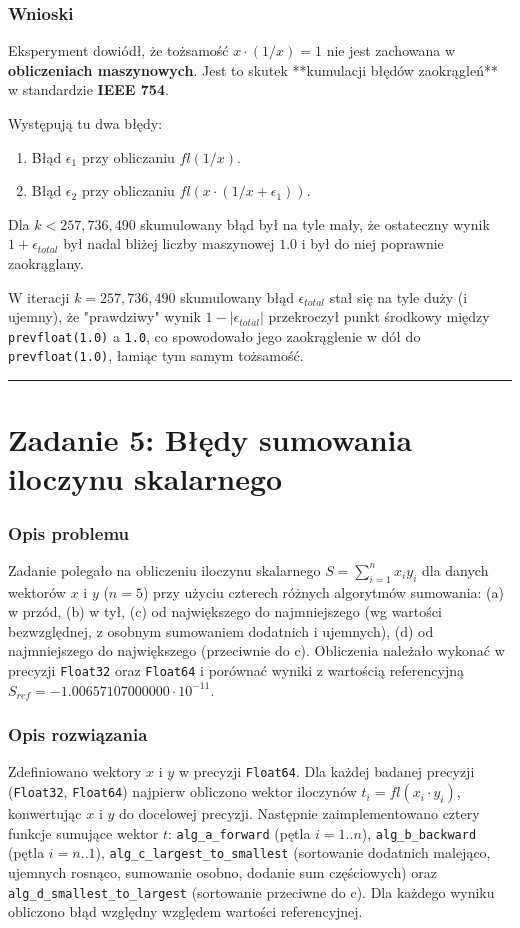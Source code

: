 \documentclass[11pt, a4paper]{article}
\newcommand{\taskseparator}{\leavevmode\leaders\hrule height 0.5pt\hfill\kern0pt}
\begin{document}
\subsubsection{Wnioski}
Eksperyment dowiódł, że tożsamość $x \cdot (1/x) = 1$ nie jest zachowana w \textbf{obliczeniach maszynowych}. Jest to skutek **kumulacji błędów zaokrągleń** w standardzie \textbf{IEEE 754}.

Występują tu dwa błędy:
\begin{enumerate}
    \item Błąd $\epsilon_1$ przy obliczaniu $fl(1/x)$.
    \item Błąd $\epsilon_2$ przy obliczaniu $fl(x \cdot (1/x + \epsilon_1))$.
\end{enumerate}
Dla $k < 257,736,490$ skumulowany błąd był na tyle mały, że ostateczny wynik $1 + \epsilon_{total}$ był nadal bliżej liczby maszynowej $1.0$ i był do niej poprawnie zaokrąglany.

W iteracji $k = 257,736,490$ skumulowany błąd $\epsilon_{total}$ stał się na tyle duży (i ujemny), że "prawdziwy" wynik $1 - |\epsilon_{total}|$ przekroczył punkt środkowy między \texttt{prevfloat(1.0)} a \texttt{1.0}, co spowodowało jego zaokrąglenie w dół do \texttt{prevfloat(1.0)}, łamiąc tym samym tożsamość.

\taskseparator

\section{Zadanie 5: Błędy sumowania iloczynu skalarnego}

\subsubsection{Opis problemu}
Zadanie polegało na obliczeniu iloczynu skalarnego $S = \sum_{i=1}^{n} x_i y_i$ dla danych wektorów $x$ i $y$ ($n=5$) przy użyciu czterech różnych algorytmów sumowania: (a) w przód, (b) w tył, (c) od największego do najmniejszego (wg wartości bezwzględnej, z osobnym sumowaniem dodatnich i ujemnych), (d) od najmniejszego do największego (przeciwnie do c). Obliczenia należało wykonać w precyzji \texttt{Float32} oraz \texttt{Float64} i porównać wyniki z wartością referencyjną $S_{ref} = -1.00657107000000 \cdot 10^{-11}$.

\subsubsection{Opis rozwiązania}
Zdefiniowano wektory $x$ i $y$ w precyzji \texttt{Float64}. Dla każdej badanej precyzji (\texttt{Float32}, \texttt{Float64}) najpierw obliczono wektor iloczynów $t_i = fl(x_i \cdot y_i)$, konwertując $x$ i $y$ do docelowej precyzji. Następnie zaimplementowano cztery funkcje sumujące wektor $t$: \texttt{alg\_a\_forward} (pętla $i=1..n$), \texttt{alg\_b\_backward} (pętla $i=n..1$), \texttt{alg\_c\_largest\_to\_smallest} (sortowanie dodatnich malejąco, ujemnych rosnąco, sumowanie osobno, dodanie sum częściowych) oraz \texttt{alg\_d\_smallest\_to\_largest} (sortowanie przeciwne do c). Dla każdego wyniku obliczono błąd względny względem wartości referencyjnej.
\end{document}
